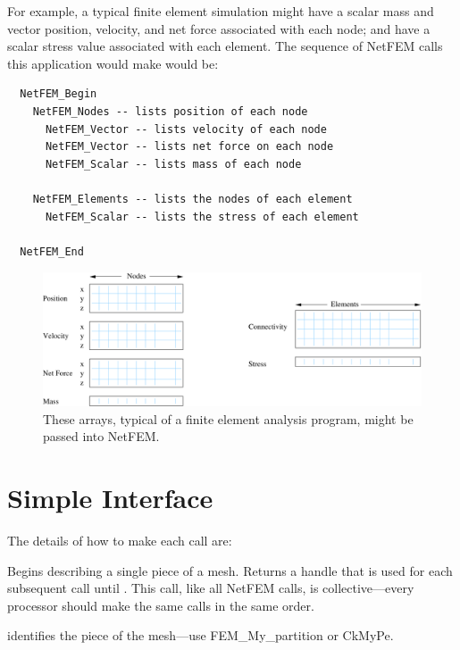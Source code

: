 \documentclass[10pt]{article}
\begin{document}
For example, a typical finite element simulation might
have a scalar mass and vector position, velocity, and net force
associated with each node; and have a scalar stress value
associated with each element.  The sequence of NetFEM calls
this application would make would be:

\begin{verbatim}
  NetFEM_Begin
    NetFEM_Nodes -- lists position of each node
      NetFEM_Vector -- lists velocity of each node
      NetFEM_Vector -- lists net force on each node
      NetFEM_Scalar -- lists mass of each node
    
    NetFEM_Elements -- lists the nodes of each element
      NetFEM_Scalar -- lists the stress of each element
  
  NetFEM_End
\end{verbatim}

\begin{figure}[h]
\begin{center}
\includegraphics[width=5in]{fig/example}
\end{center}
\caption{These arrays, typical of a finite element analysis
program, might be passed into NetFEM.}
\label{fig:example}
\end{figure}


\section{Simple Interface}
The details of how to make each call are:


Begins describing a single piece of a mesh.  Returns a handle
that is used for each subsequent call until .  
This call, like all NetFEM calls, is collective---every processor 
should make the same calls in the same order.

 identifies the piece of the mesh---use FEM\_My\_partition
or CkMyPe.
\end{document}
